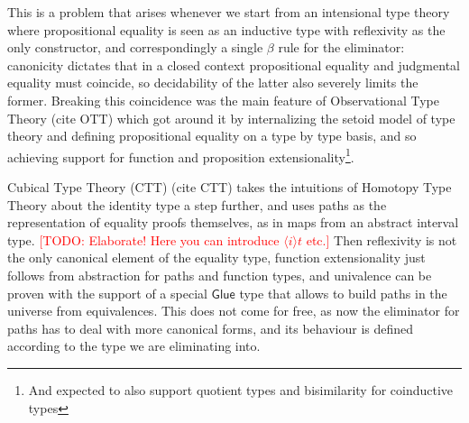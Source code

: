 \documentclass{book}
\newcommand{\TODO}[1]{\textcolor{red}{[TODO: #1]}}
\begin{document}
  This is a problem that arises whenever we start from an intensional
  type theory where propositional equality is seen as an inductive
  type with reflexivity as the only constructor, and correspondingly a
  single $\beta$ rule for the eliminator: canonicity dictates that in
  a closed context propositional equality and judgmental equality must
  coincide, so decidability of the latter also severely limits the
  former. Breaking this coincidence was the main feature of Observational Type Theory (cite OTT) which got around it by
  internalizing the setoid model of type theory and defining
  propositional equality on a type by type basis, and so achieving
  support for function and proposition extensionality\footnote{And expected to also support quotient types and bisimilarity for coinductive types}.

  Cubical Type Theory (CTT) (cite CTT) takes the intuitions of Homotopy
  Type Theory about the identity type a step further, and uses paths
  as the representation of equality proofs themselves, as in maps from
  an abstract interval type.  \TODO{Elaborate!  Here you can introduce
    $\langle i \rangle t$ etc.}
  Then reflexivity is not the only
  canonical element of the equality type, function extensionality just
  follows from abstraction for paths and function types, and
  univalence can be proven with the support of a special
  $\mathsf{Glue}$ type that allows to build paths in the universe from
  equivalences. This does not come for free, as now the eliminator for
  paths has to deal with more canonical forms, and its
  behaviour is defined according to the type we are eliminating into.
\end{document}
